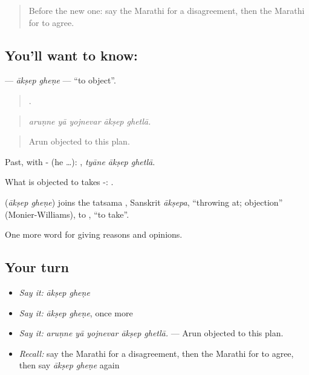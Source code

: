 \label{lesson:MR-C344-aksep-ghene}



\begin{quote}
Before the new one: say the Marathi for a disagreement, then the Marathi for to agree.
\end{quote}

\subsection*{You'll want to know:  }
\textbf{ } — \emph{ākṣep gheṇe} — \textquotedblleft{}to object\textquotedblright{}.

\begin{quote}
    .
\end{quote}

\begin{quote}
\emph{aruṇne yā yojnevar ākṣep ghetlā.}
\end{quote}

\begin{quote}
Arun objected to this plan.
\end{quote}

Past, with - (he …):   , \emph{tyāne ākṣep ghetlā}.

What is objected to takes -:   .

\begin{cousinweb}
\textbf{ } (\emph{ākṣep gheṇe}) joins the tatsama , Sanskrit \emph{ākṣepa}, \textquotedblleft{}throwing at; objection\textquotedblright{} (Monier-Williams), to , \textquotedblleft{}to take\textquotedblright{}.
\end{cousinweb}

\begin{grammarlens}[title={What you've built}]
One more word for giving reasons and opinions.
\end{grammarlens}

\subsection*{Your turn}
\begin{itemize}
\raggedright
  \item \emph{Say it:} \emph{ākṣep gheṇe}
  \item \emph{Say it:} \emph{ākṣep gheṇe}, once more
  \item \emph{Say it:} \emph{aruṇne yā yojnevar ākṣep ghetlā.} — Arun objected to this plan.
  \item \emph{Recall:} say the Marathi for a disagreement, then the Marathi for to agree, then say \emph{ākṣep gheṇe} again
\end{itemize}

